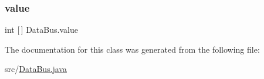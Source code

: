 \mbox{\label{class_data_bus_a19d6a0a609bf5e25c4fee2f1d21454d3}} 
\subsubsection{\texorpdfstring{value}{value}}
{\footnotesize\ttfamily int \mbox{[}$\,$\mbox{]} Data\+Bus.\+value\hspace{0.3cm}{\ttfamily [private]}}



The documentation for this class was generated from the following file\+:\begin{DoxyCompactItemize}
\item 
src/\mbox{\hyperlink{_data_bus_8java}{Data\+Bus.\+java}}\end{DoxyCompactItemize}
